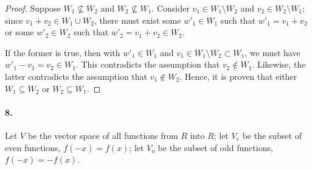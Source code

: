 \documentclass{article}
\begin{document}
\begin{proof}
  Suppose $W_1 \not\subseteq W_2$ and $W_2 \not\subseteq W_1$. Consider $v_1 \in
  W_1 \setminus W_2$ and $v_2 \in W_2 \setminus W_1$; since $v_1 + v_2 \in W_1
  \cup W_2$, there must exist some $w'_1 \in W_1$ such that $w'_1 = v_1 + v_2$
  or some $w'_2 \in W_2$ such that $w'_2 = v_1 + v_2 \in W_2$.

  If the former is true, then with $w'_1 \in W_1$ and $v_1 \in W_1 \setminus W_2
  \subset W_1$, we must have $w'_1 - v_1 = v_2 \in W_1$. This contradicts the
  assumption that $v_2 \not\in W_1$. Likewise, the latter contradicts the
  assumption that $v_1 \not\in W_2$. Hence, it is proven that either $W_1
  \subseteq W_2$ or $W_2 \subseteq W_1$.
\end{proof}

\paragraph{8.} Let $V$ be the vector space of all functions from $R$ into $R$;
let $V_e$ be the subset of even functions, $f(-x) = f(x)$; let $V_o$ be the
subset of odd functions, $f(-x) = -f(x)$.
\end{document}
